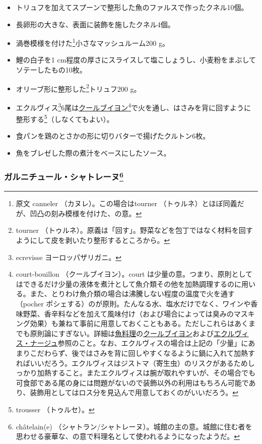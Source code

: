 \begin{recette}
\begin{itemize}
\item
  トリュフを加えてスプーンで整形した魚のファルスで作ったクネル10個。
\item
  長卵形の大きな、表面に装飾を施したクネル4個。
\item
  渦巻模様を付けた\footnote{原文 canneler （カヌレ）。この場合はtourner
    （トゥルネ）とほぼ同義だが、凹凸の刻み模様を付けた、の意。}小さなマッシュルーム200
  g。
\item
  鯉の白子を1
  cm程度の厚さにスライスして塩こしょうし、小麦粉をまぶしてソテーしたもの10枚。
\item
  オリーブ形に整形した\footnote{tourner
    （トゥルネ）。原義は「回す」。野菜などを包丁ではなく材料を回すようにして皮を剥いたり整形するところから。}トリュフ200
  g。
\item
  エクルヴィス\footnote{ecrevisse ヨーロッパザリガニ。}6尾は\protect\hyperlink{courtbouillon-a}{クールブイヨン}\footnote{court-bouillon
    （クールブイヨン）。court
    は少量の意。つまり、原則としてはできるだけ少量の液体を煮汁として魚介類その他を加熱調理するのに用いる。また、とりわけ魚介類の場合は沸騰しない程度の温度で火を通す（pocher
    ポシェする）のが原則。たんなる水、塩水だけでなく、ワインや香味野菜、香辛料などを加えて風味付け（および場合によっては臭みのマスキング効果）も兼ねて事前に用意しておくこともある。ただしこれらはあくまでも原則論にすぎない。詳細は\protect\hyperlink{poissons}{魚料理}の\protect\hyperlink{serie-de-courts-bouillons-de-poisson}{クールブイヨン}および\protect\hyperlink{ecrevisse-a-la-nage}{エクルヴィス・ナージュ}参照のこと。なお、エクルヴィスの場合は上記の「少量」にあまりこだわらず、後ではさみを背に回しやすくなるように鍋に入れて加熱すればいいだろう。エクルヴィスはジストマ（寄生虫）のリスクがあるためしっかり加熱すること。またエクルヴィスは腕が取れやすいが、その場合でも可食部である尾の身には問題がないので装飾以外の利用はもちろん可能であり、装飾用としてはロス分を見込んで用意しておくのがいいだろう。}で火を通し、はさみを背に回すように整形する\footnote{trousser
    （トゥルセ）。}（しなくてもよい）。
\item
  食パンを鶏のとさかの形に切りバターで揚げたクルトン6枚。
\item
  魚をブレゼした際の煮汁をベースにしたソース。
\end{itemize}

\hypertarget{garniture-chatelaine}{%
\subsubsection[ガルニチュール・シャトレーヌ]{\texorpdfstring{ガルニチュール・シャトレーヌ\footnote{châtelain(e)
  （シャトラン/シャトレーヌ）。城館の主の意。城館に住む者を思わせる豪華な、の意で料理名として使われるようになったようだ。}}{ガルニチュール・シャトレーヌ}}\label{garniture-chatelaine}}


\end{recette}
